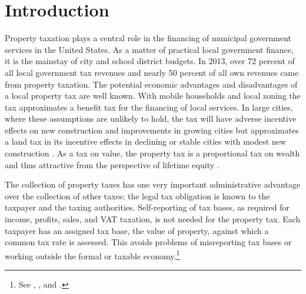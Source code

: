 \documentclass[12pt]{article}
\begin{document}
\newpage

\section{Introduction}

Property taxation plays a central role in the financing of municipal
government services in the United States. As a matter of practical
local government finance, it is the mainstay of city and school
district budgets.  In 2013, over 72 percent of all local government
tax revenues and nearly 50 percent of all own revenues came from
property taxation. The potential economic advantages and disadvantages
of a local property tax are well known.  With mobile households and
local zoning the tax approximates a benefit tax for the financing of
local services.  In large cities, where these assumptions are unlikely
to hold, the tax will have adverse incentive effects on new
construction and improvements in growing cities but approximates a
land tax in its incentive effects in declining or stable cities with
modest new construction \cite{Aaron-75}.  As a tax on value, the
property tax is a proportional tax on wealth and thus attractive from
the perspective of lifetime equity \cite{Mieszkowski-72}.

The collection of property taxes has one very important administrative
advantage over the collection of other taxes: the legal tax obligation
is known to the taxpayer and the taxing authorities.  Self-reporting
of tax bases, as required for income, profits, sales, and VAT
taxation, is not needed for the property tax. Each taxpayer has an
assigned tax base, the value of property, against which a common tax
rate is assessed.  This avoids problems of misreporting tax bases or
working outside the formal or  taxable economy.\footnote{See
  , , and .}
\end{document}

